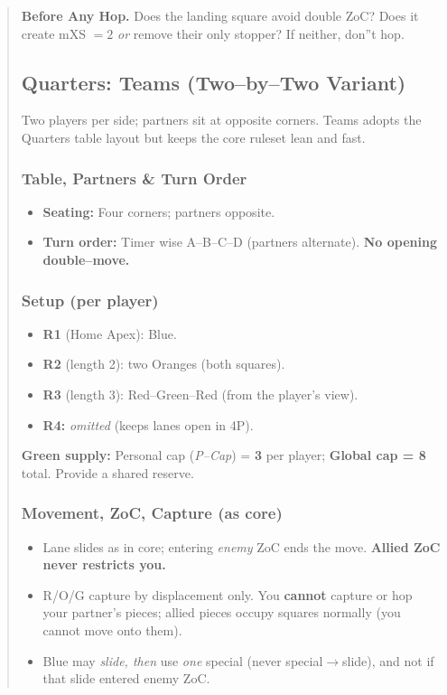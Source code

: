 \documentclass[11pt]{article}
\begin{document}
\begin{quote}
\begin{tcolorbox}[enhanced,breakable,title={Pocket Checklists (Say it before you move)},
  colback=white,colframe=royal,boxrule=0.8pt]
\textbf{Before Any Hop.} Does the landing square avoid double ZoC? Does it create mXS $=2$ \emph{or} remove their only stopper? If neither, don''t hop.
\end{tcolorbox}

\subsection{Quarters: Teams (Two--by--Two Variant)}
\label{sec:teams}

\noindent Two players per side; partners sit at opposite corners. Teams adopts the Quarters table layout but keeps the core ruleset lean and fast.

\subsubsection*{Table, Partners \& Turn Order}
\begin{itemize}[leftmargin=1.3em,itemsep=0.25em]
  \item \textbf{Seating:} Four corners; partners opposite.
  \item \textbf{Turn order:} Timer wise A--B--C--D (partners alternate). \textbf{No opening double--move.}
\end{itemize}

\subsubsection*{Setup (per player)}
\begin{itemize}[leftmargin=1.3em,itemsep=0.25em]
  \item \textbf{R1} (Home Apex): Blue.
  \item \textbf{R2} (length 2): two Oranges (both squares).
  \item \textbf{R3} (length 3): Red--Green--Red (from the player's view).
  \item \textbf{R4:} \emph{omitted} (keeps lanes open in 4P).
\end{itemize}
\noindent \textbf{Green supply:} Personal cap (\emph{P--Cap}) = \textbf{3} per player; \textbf{Global cap = 8} total. Provide a shared reserve.

\subsubsection*{Movement, ZoC, Capture (as core)}
\begin{itemize}[leftmargin=1.3em,itemsep=0.2em]
  \item Lane slides as in core; entering \emph{enemy} ZoC ends the move. \textbf{Allied ZoC never restricts you.}
  \item R/O/G capture by displacement only. You \textbf{cannot} capture or hop your partner's pieces; allied pieces occupy squares normally (you cannot move onto them).
  \item Blue may \emph{slide, then} use \emph{one} special (never special$\rightarrow$slide), and not if that slide entered enemy ZoC.
\end{itemize}


\end{quote}
\end{document}
